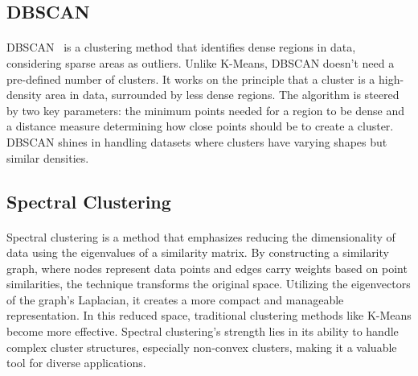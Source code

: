     \subsection{DBSCAN}
        \paragraph*{}DBSCAN~\cite{ester_density-based_1996} is a clustering method that identifies dense regions in data, considering sparse areas as outliers. Unlike K-Means, DBSCAN doesn't need a pre-defined number of clusters. It works on the principle that a cluster is a high-density area in data, surrounded by less dense regions. The algorithm is steered by two key parameters: the minimum points needed for a region to be dense and a distance measure determining how close points should be to create a cluster. DBSCAN shines in handling datasets where clusters have varying shapes but similar densities.
    \subsection{Spectral Clustering}
        \paragraph{}Spectral clustering\cite{von_luxburg_tutorial_2007} is a method that emphasizes reducing the dimensionality of data using the eigenvalues of a similarity matrix. By constructing a similarity graph, where nodes represent data points and edges carry weights based on point similarities, the technique transforms the original space. Utilizing the eigenvectors of the graph's Laplacian, it creates a more compact and manageable representation. In this reduced space, traditional clustering methods like K-Means become more effective. Spectral clustering's strength lies in its ability to handle complex cluster structures, especially non-convex clusters, making it a valuable tool for diverse applications.